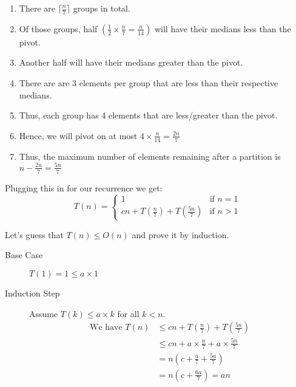 \documentclass[a4paper,12pt]{article}
\begin{document}
\begin{enumerate}
    \item There are \(\lceil \frac{n}{7} \rceil\) groups in total.
    \item Of those groups, half \(\left( \frac{1}{2} \times \frac{n}{7} = \frac{n}{14}\right)\) will have their medians less than the pivot.
    \item Another half will have their medians greater than the pivot.
    \item There are are 3 elements per group that are less than their respective medians.
    \item Thus, each group has 4 elements that are less/greater than the pivot.
    \item Hence, we will pivot on at most \(4 \times \frac{n}{14} = \frac{2n}{7}\)
    \item Thus, the maximum number of elements remaining after a partition is \(n - \frac{2n}{7} = \frac{5n}{7}\)
\end{enumerate}

Plugging this in for our recurrence we get:
\begin{equation*}
    T(n) = \begin{cases}
        1                                                           & \text{if } n = 1 \\
        cn + T\left(\frac{n}{7}\right) + T\left(\frac{5n}{7}\right) & \text{if } n > 1
    \end{cases}
\end{equation*}

Let's guess that \(T(n) \leq O(n)\) and prove it by induction.

\begin{description}
    \item[Base Case] \(T(1) = 1 \leq a \times 1\)
    \item[Induction Step] Assume \(T(k) \leq a \times k\) for all \(k < n\).
        \begin{align*}
            \text{We have }  T(n) & \leq cn + T\left(\frac{n}{7}\right) + T\left(\frac{5n}{7}\right) \\
                                  & \leq cn + a \times \frac{n}{7} + a \times \frac{5n}{7}           \\
                                  & = n\left(c + \frac{a}{7} + \frac{5a}{7}\right)                   \\
                                  & = n\left(c + \frac{6a}{7}\right) = an                            \\
        \end{align*}
\end{description}
\end{document}
